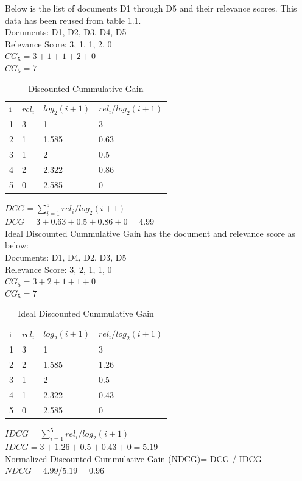 \documentclass[12pt]{report}
\begin{document}
Below is the list of documents D1 through D5 and their relevance scores. This data has been reused from table 1.1.\\
Documents: D1, D2, D3, D4, D5\\
Relevance Score: 3, 1, 1, 2, 0\\
$CG_5 = 3+ 1+ 1+ 2+ 0$\\
$CG_5 = 7$ \\
\begin{table}[]
\centering
\caption{Discounted Cummulative Gain}
\label{my-label}
\begin{tabular}{llll}
i & $rel_i$ & $log_2(i + 1)$   & $rel_i / log_2(i + 1)$  \\
1 & 3        & 1     		    & 3    \\
2 & 1        & 1.585 		    & 0.63 \\
3 & 1        & 2     		    & 0.5  \\
4 & 2        & 2.322 		    & 0.86 \\
5 & 0        & 2.585 		    & 0   
\end{tabular}
\end{table}
$DCG = \sum\limits_{i=1}^5 rel_i / log_2(i + 1)$ \\
$DCG = 3 + 0.63 + 0.5 + 0.86 + 0 =  4.99$\\
Ideal Discounted Cummulative Gain has the document and relevance score as below:\\
Documents: D1, D4, D2, D3, D5\\
Relevance Score: 3, 2, 1, 1, 0\\
$CG_5 = 3+ 2+ 1+ 1+ 0$\\
$CG_5 = 7$ \\
\begin{table}[]
\centering
\caption{Ideal Discounted Cummulative Gain}
\label{my-label}
\begin{tabular}{llll}
i & $rel_i$ & $log_2(i + 1)$   & $rel_i / log_2(i + 1)$  \\
1 & 3        & 1     		    & 3    \\
2 & 2        & 1.585 		    & 1.26 \\
3 & 1        & 2     		    & 0.5  \\
4 & 1        & 2.322 		    & 0.43 \\
5 & 0        & 2.585 		    & 0   
\end{tabular}
\end{table}
$IDCG = \sum\limits_{i=1}^5 rel_i / log_2(i + 1)$ \\
$IDCG = 3 + 1.26 + 0.5 + 0.43 + 0 =  5.19$\\
Normalized Discounted Cummulative Gain (NDCG)=  DCG / IDCG\\
$NDCG = 4.99 / 5.19 = 0.96$
\end{document}
